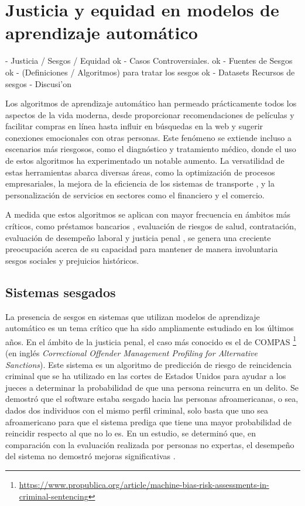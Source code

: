 \chapter{Justicia y equidad en modelos de aprendizaje autom\'atico}\label{chapter:state-of-the-art}

- Justicia / Sesgos / Equidad ok
- Casos Controversiales. ok
- Fuentes de Sesgos ok
- (Definiciones / Algoritmos) para tratar los sesgos ok
- Datasets Recursos de sesgos
- Discusi'on

Los algoritmos de aprendizaje autom\'atico han permeado pr\'acticamente todos los aspectos de la vida moderna,
desde proporcionar recomendaciones de pel\'iculas y facilitar compras en l\'inea hasta influir en b\'usquedas en la web
y sugerir conexiones emocionales con otras personas. Este fen\'omeno se extiende incluso a escenarios m\'as riesgosos,
como el diagn\'ostico y tratamiento m\'edico, donde el uso de estos algoritmos ha experimentado un notable aumento.
La versatilidad de estas herramientas abarca diversas \'areas, como la optimizaci\'on de procesos empresariales, la 
mejora de la eficiencia de los sistemas de transporte \cite{autonomous_driving}, y la personalizaci\'on de servicios en 
sectores como el financiero y el comercio.

A medida que estos algoritmos se aplican con mayor frecuencia en \'ambitos m\'as cr\'iticos, como
pr\'estamos bancarios \cite{fairness_def}, evaluaci\'on de riesgos de salud, contrataci\'on, evaluaci\'on de desempe\~no laboral y
justicia penal \cite{compas}, se genera una creciente preocupaci\'on acerca de su capacidad para mantener de manera involuntaria 
sesgos sociales y prejuicios hist\'oricos. 

\section{Sistemas sesgados}

    La presencia de sesgos en sistemas que utilizan modelos de aprendizaje autom\'atico es un tema cr\'itico que ha sido
    ampliamente estudiado en los \'ultimos a\~nos. En el \'ambito de la justicia penal, el caso m\'as conocido es el de COMPAS
    \footnote{\url{https://www.propublica.org/article/machine-bias-risk-assessments-in-criminal-sentencing}}
    (en ingl\'es \textit{Correctional Offender Management Profiling for Alternative Sanctions}). Este sistema es un algoritmo de predicci\'on
    de riesgo de reincidencia criminal que se ha utilizado en las cortes de Estados Unidos para ayudar a los jueces a determinar la 
    probabilidad de que una persona reincurra en un delito. Se demostr\'o que el software estaba sesgado hacia las personas 
    afroamericanas, o sea, dados dos individuos con el mismo perfil criminal, solo basta que uno sea afroamericano para que el
    sistema prediga que tiene una mayor probabilidad de reincidir respecto al que no lo es. En un estudio, se determin\'o que, 
    en comparaci\'on con la evaluaci\'on realizada por personas no expertas, el desempe\~no del sistema no demostr\'o mejoras 
    significativas \cite{compas2}. 

